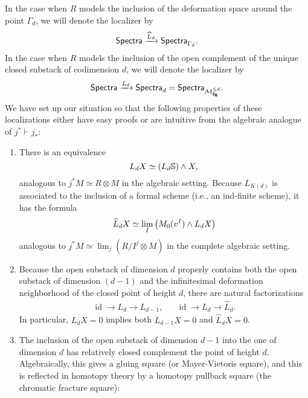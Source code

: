 In the case when $R$ models the inclusion of the deformation space around the point $\Gamma_d$, we will denote the localizer by \[\mathsf{Spectra} \xrightarrow{\widehat L_d} \mathsf{Spectra}_{\Gamma_d}.\]  In the case when $R$ models the inclusion of the open complement of the unique closed substack of codimension $d$, we will denote the localizer by \[\mathsf{Spectra} \xrightarrow{L_d} \mathsf{Spectra}_d = \mathsf{Spectra}_{\mathcal{M}_{\mathbf{fg}}^{\le d}}.\]  We have set up our situation so that the following properties of these localizations either have easy proofs or are intuitive from the algebraic analogue of $j^* \vdash j_*$:
\begin{enumerate}
\item There is an equivalence \[L_d X \simeq (L_d \mathbb S) \wedge X,\] analogous to $j^* M \simeq R \otimes M$ in the algebraic setting.  Because $L_{K(d)}$ is associated to the inclusion of a formal scheme (i.e., an ind-finite scheme), it has the formula \[\widehat L_d X \simeq \lim_I \left( M_0(v^I) \wedge L_d X \right)\] analogous to $j^* M \simeq \lim_j (R/I^j \otimes M)$ in the complete algebraic setting.
\item Because the open substack of dimension $d$ properly contains both the open substack of dimension $(d-1)$ and the infinitesimal deformation neighborhood of the closed point of height $d$, there are natural factorizations
\begin{align*}
\operatorname{id} \to L_d \to L_{d-1}, & & \operatorname{id} \to L_d \to \widehat L_d.
\end{align*}
In particular, $L_d X = 0$ implies both $L_{d-1} X = 0$ and $\widehat L_d X = 0$.
\item The inclusion of the open substack of dimension $d-1$ into the one of dimension $d$ has relatively closed complement the point of height $d$.  Algebraically, this gives a gluing square (or Mayer-Vietoris square), and this is reflected in homotopy theory by a homotopy pullback square (the chromatic fracture square):
\begin{center}
\end{center}
\end{enumerate}

